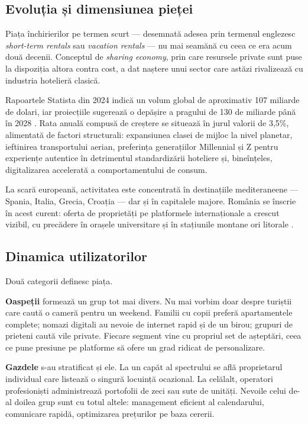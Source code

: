 \documentclass[12pt,a4paper,oneside]{report}
\begin{document}
\subsection{Evoluția și dimensiunea pieței}

Piața închirierilor pe termen scurt — desemnată adesea prin termenul englezesc \textit{short-term rentals} sau \textit{vacation rentals} — nu mai seamănă cu ceea ce era acum două decenii. Conceptul de \textit{sharing economy}, prin care resursele private sunt puse la dispoziția altora contra cost, a dat naștere unui sector care astăzi rivalizează cu industria hotelieră clasică.

Rapoartele Statista din 2024 indică un volum global de aproximativ 107 miliarde de dolari, iar proiecțiile sugerează o depășire a pragului de 130 de miliarde până în 2028 \cite{statista2024}. Rata anuală compusă de creștere se situează în jurul valorii de 3,5\%, alimentată de factori structurali: expansiunea clasei de mijloc la nivel planetar, ieftinirea transportului aerian, preferința generațiilor Millennial și Z pentru experiențe autentice în detrimentul standardizării hoteliere și, bineînțeles, digitalizarea accelerată a comportamentului de consum.

La scară europeană, activitatea este concentrată în destinațiile mediteraneene — Spania, Italia, Grecia, Croația — dar și în capitalele majore. România se înscrie în acest curent: oferta de proprietăți pe platformele internaționale a crescut vizibil, cu precădere în orașele universitare și în stațiunile montane ori litorale \cite{grandview2024}.

\subsection{Dinamica utilizatorilor}

Două categorii definesc piața.

\textbf{Oaspeții} formează un grup tot mai divers. Nu mai vorbim doar despre turiștii care caută o cameră pentru un weekend. Familii cu copii preferă apartamentele complete; nomazi digitali au nevoie de internet rapid și de un birou; grupuri de prieteni caută vile private. Fiecare segment vine cu propriul set de așteptări, ceea ce pune presiune pe platforme să ofere un grad ridicat de personalizare.

\textbf{Gazdele} s-au stratificat și ele. La un capăt al spectrului se află proprietarul individual care listează o singură locuință ocazional. La celălalt, operatori profesioniști administrează portofolii de zeci sau sute de unități. Nevoile celui de-al doilea grup sunt cu totul altele: management eficient al calendarului, comunicare rapidă, optimizarea prețurilor pe baza cererii.
\end{document}
